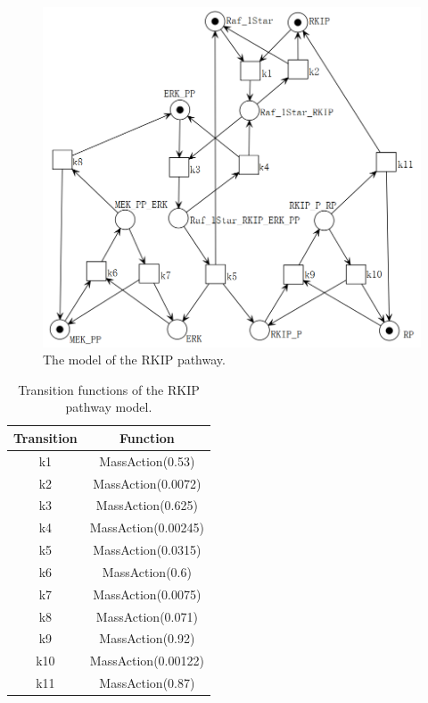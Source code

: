 \documentclass[journal,a4paper,onecolumn]{article}
\begin{document}
\begin{figure}[!hbt]
	\begin{center}
		\includegraphics[width=\columnwidth]{fig28}
		\caption{The model of the RKIP pathway.}
		\label{fig:The model of RKIP}
	\end{center}
\end{figure}

\begin{table}[!hbt]
	\begin{center}
		\caption{Transition functions of the RKIP pathway model.}
		\label{Transition functions of RKIP}
		\begin{tabular}{|c|c|}
			\hline
			Transition&Function\\
			\hline
			k1&MassAction(0.53)\\
			\hline
						k2&MassAction(0.0072)\\
			\hline
						k3&MassAction(0.625)\\
			\hline
						k4&MassAction(0.00245)\\
			\hline
						k5&MassAction(0.0315)\\
			\hline
						k6&MassAction(0.6)\\
			\hline
						k7&MassAction(0.0075)\\
			\hline
						k8&MassAction(0.071)\\
			\hline
						k9&MassAction(0.92)\\
			\hline
						k10&MassAction(0.00122)\\
			\hline
						k11&MassAction(0.87)\\
			\hline
		\end{tabular}
	\end{center}
\end{table}
\end{document}
